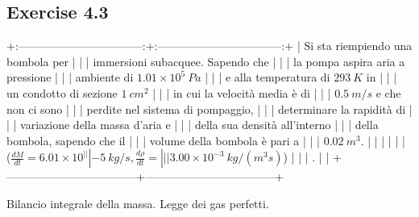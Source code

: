 \documentclass[letterpaper,10pt,italian]{jupyterBook}
\begin{document}
\sphinxstepscope


\subsection{Exercise 4.3}
\label{\detokenize{polimi/fluidmechanics-ita/template/capitoli/04_bilanci/0407in:exercise-4-3}}\label{\detokenize{polimi/fluidmechanics-ita/template/capitoli/04_bilanci/0407in:fluid-mechanics-balances-ex-03}}\label{\detokenize{polimi/fluidmechanics-ita/template/capitoli/04_bilanci/0407in::doc}}
\sphinxAtStartPar
+:———————————:+:———————————:+
| Si sta riempiendo una bombola per |                                   |
| immersioni subacquee. Sapendo che |                                   |
| la pompa aspira aria a pressione  |                                   |
| ambiente di \(1.01\times10^5\ Pa\)  |                                   |
| e alla temperatura di \(293\ K\) in |                                   |
| un condotto di sezione \(1\ cm^2\)  |                                   |
| in cui la velocità media è di     |                                   |
| \(0.5\ m/s\) e che non ci sono      |                                   |
| perdite nel sistema di pompaggio, |                                   |
| determinare la rapidità di        |                                   |
| variazione della massa d’aria e   |                                   |
| della sua densità all’interno     |                                   |
| della bombola, sapendo che il     |                                   |
| volume della bombola è pari a     |                                   |
| \(0.02 \  m^3\).                    |                                   |
|                                   |                                   |
| (\(\frac{dM}{dt} = 6.01 \times 10^ |                                   |
| {-5}\ kg/s, \frac{d \rho}{d t} =  |                                   |
| 3.00 \times 10^{-3}\ kg/(m^3 s)\)) |                                   |
| .                                 |                                   |
+———————————–+———————————–+

\sphinxAtStartPar
Bilancio integrale della massa. Legge dei gas perfetti.
\end{document}
